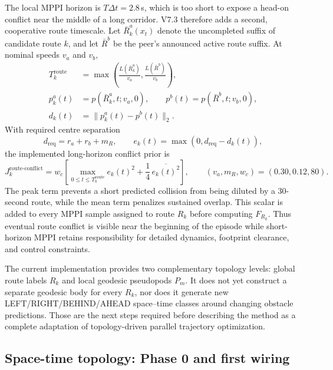 \documentclass[11pt,a4paper]{article}
\begin{document}
The local MPPI horizon is $T\Delta t=2.8$\,s, which is too short to expose a
head-on conflict near the middle of a long corridor. V7.3 therefore adds a
second, cooperative route timescale. Let $\bar R^a_k(x_t)$ denote the
uncompleted suffix of candidate route $k$, and let $\bar R^b$ be the peer's
announced active route suffix. At nominal speeds $v_a$ and $v_b$,
\begin{align}
 T_{k}^{\mathrm{route}}
 &=\max\!\left(
   \frac{L(\bar R^a_k)}{v_a},
   \frac{L(\bar R^b)}{v_b}\right),\\
 p^a_k(t)&=p(\bar R^a_k,t;v_a,0),
 \qquad
 p^b(t)=p(\bar R^b,t;v_b,0),\\
 d_{k}(t)&=\|p^a_k(t)-p^b(t)\|_2.
\end{align}
With required centre separation
\begin{equation}
 d_{\mathrm{req}}=r_a+r_b+m_R,
 \qquad
 e_k(t)=\max(0,d_{\mathrm{req}}-d_k(t)),
\end{equation}
the implemented long-horizon conflict prior is
\begin{equation}
 J_k^{\mathrm{route\mbox{-}conflict}}
 =w_c\left[
   \max_{0\le t\le T_k^{\mathrm{route}}}e_k(t)^2
   +\frac{1}{4}\,\overline{e_k(t)^2}
 \right],
 \qquad
 (v_a,m_R,w_c)=(0.30,0.12,80).
 \label{eq:long-route-conflict}
\end{equation}
The peak term prevents a short predicted collision from being diluted by a
30-second route, while the mean term penalizes sustained overlap. This scalar
is added to every MPPI sample assigned to route $R_k$ before computing
$F_{R_k}$. Thus eventual route conflict is visible near the beginning of the
episode while short-horizon MPPI retains responsibility for detailed dynamics,
footprint clearance, and control constraints.

The current implementation provides two complementary topology levels:
global route labels $R_k$ and local geodesic pseudopods $P_m$. It does not yet
construct a separate geodesic body for every $R_k$, nor does it generate new
LEFT/RIGHT/BEHIND/AHEAD space--time classes around changing obstacle
predictions. Those are the next steps required before describing the method as
a complete adaptation of topology-driven parallel trajectory optimization.

\subsection{Space-time topology: Phase 0 and first wiring}
\end{document}
